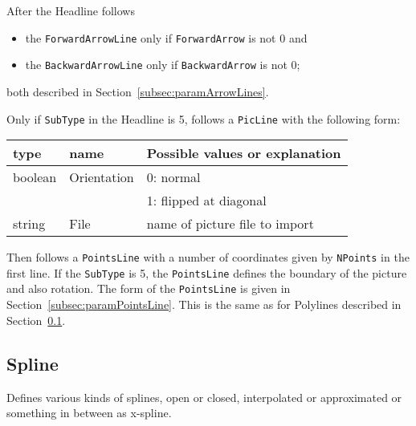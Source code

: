 \documentclass[10pt, a4paper]{article}
\begin{document}
\noindent
After the Headline follows 
%
\begin{itemize}
\item
the {\tt ForwardArrowLine}  only if {\tt ForwardArrow}  is not 0 and 
\item
the {\tt BackwardArrowLine} only if {\tt BackwardArrow} is not 0; 
\end{itemize}
%
both described in Section~\ref{subsec:paramArrowLines}. 


Only if {\tt SubType} in the Headline is 5, 
follows a {\tt PicLine} with the following form:
%
\begin{tabular}{|lll|}
\hline
type    & name        & Possible values or explanation \\
\hline
\hline
boolean & Orientation & 0: normal \\
&&                      1: flipped at diagonal \\
string  & File        & name of picture file to import \\
\hline
\end{tabular}

Then follows a {\tt PointsLine} with a number of coordinates 
given by {\tt NPoints} in the first line. 
If the {\tt SubType} is 5, the {\tt PointsLine} 
defines the boundary of the picture and also rotation. 
The form of the {\tt PointsLine} is given 
in Section~\ref{subsec:paramPointsLine}. 
This is the same as for Polylines described in Section~\ref{subsec:spline}. 



\subsection{Spline }\label{subsec:spline}

Defines various kinds of splines, 
open or closed, interpolated or approximated or 
something in between as x-spline. 
\end{document}
